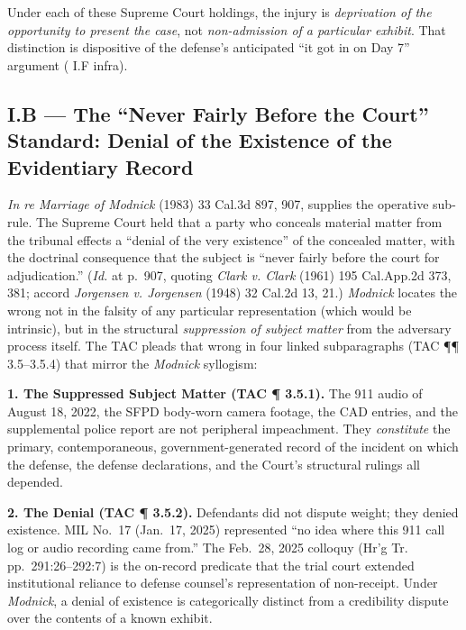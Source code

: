 Under each of these Supreme Court holdings, the injury is \emph{deprivation of the opportunity to present the case}, not \emph{non-admission of a particular exhibit}. That distinction is dispositive of the defense's anticipated ``it got in on Day 7'' argument (\textsection{} I.F infra).

\subsection{I.B --- The ``Never Fairly Before the Court'' Standard: Denial of the Existence of the Evidentiary Record}\label{i.b-the-never-fairly-before-the-court-standard-denial-of-the-existence-of-the-evidentiary-record}

\emph{In re Marriage of Modnick} (1983) 33 Cal.3d 897, 907, supplies the operative sub-rule. The Supreme Court held that a party who conceals material matter from the tribunal effects a ``denial of the very existence'' of the concealed matter, with the doctrinal consequence that the subject is ``never fairly before the court for adjudication.'' (\emph{Id.} at p.~907, quoting \emph{Clark v. Clark} (1961) 195 Cal.App.2d 373, 381; accord \emph{Jorgensen v. Jorgensen} (1948) 32 Cal.2d 13, 21.) \emph{Modnick} locates the wrong not in the falsity of any particular representation (which would be intrinsic), but in the structural \emph{suppression of subject matter} from the adversary process itself. The TAC pleads that wrong in four linked subparagraphs (TAC ¶¶ 3.5--3.5.4) that mirror the \emph{Modnick} syllogism:

\textbf{1. The Suppressed Subject Matter (TAC ¶ 3.5.1).} The 911 audio of August 18, 2022, the SFPD body-worn camera footage, the CAD entries, and the supplemental police report are not peripheral impeachment. They \emph{constitute} the primary, contemporaneous, government-generated record of the incident on which the defense, the defense declarations, and the Court's structural rulings all depended.

\textbf{2. The Denial (TAC ¶ 3.5.2).} Defendants did not dispute weight; they denied existence. MIL No.~17 (Jan.~17, 2025) represented ``no idea where this 911 call log or audio recording came from.'' The Feb.~28, 2025 colloquy (Hr'g Tr. pp.~291:26--292:7) is the on-record predicate that the trial court extended institutional reliance to defense counsel's representation of non-receipt. Under \emph{Modnick}, a denial of existence is categorically distinct from a credibility dispute over the contents of a known exhibit.

